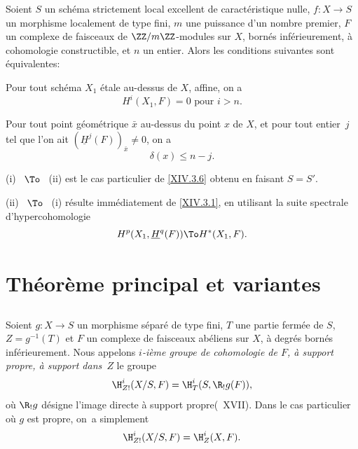 \begin{corollaire} \label{XIV.3.7}
Soient $S$ un sch\'ema strictement local excellent de caract\'eristique nulle, $f:X \to S$ un morphisme localement de type fini, $m$ une puissance d'un nombre premier, $F$ un complexe de faisceaux de $\ZZ/m\ZZ$-modules sur $X$, born\'es inf\'erieurement, \`a cohomologie constructible, et $n$ un entier. Alors les conditions suivantes sont \'equivalentes:
\begin{enumeratei}
\item
Pour tout sch\'ema $X_1$ \'etale au-dessus de $X$, affine, on a
$$
H^i(X_1, F)=0\text{ pour }i>n.
$$

\item
Pour tout point g\'eom\'etrique $\bar{x}$ au-dessus du point $x$ de $X$, et pour tout entier~$j$ tel que l'on ait $(\underline{H}^j(F))_{\bar{x}} \neq 0$, on a
$$
\delta(x) \leq n-j.
$$
\end{enumeratei}
\end{corollaire}

\textup{(i)} ~$\To$~ \textup{(ii)} est le cas particulier de \ref{XIV.3.6} obtenu en faisant $S=S'$.

\textup{(ii)} ~$\To$~ \textup{(i)} r\'esulte imm\'ediatement de \ref{XIV.3.1}, en utilisant la suite spectrale d'hypercohomologie
$$
H^p(X_1, \underline{H}^q(F)) \To H^*(X_1, F).
$$

\section{Th\'eor\`eme principal et variantes} \label{XIV.4}

\setcounter{subsection}{-1}

\subsection{} \label{XIV.4.0}
Soient $g\colon X\to S$ un morphisme s\'epar\'e de type fini, $T$ une partie ferm\'ee de $S$, \hbox{$Z=g^{-1}(T)$} et $F$ un complexe de faisceaux ab\'eliens sur $X$, \`a degr\'es born\'es inf\'erieurement. Nous appelons \emph{$i$-ième groupe de cohomologie de $F$, à support propre, à support dans~$Z$} le groupe
$$
\H_{Z!}^{i}(X/S, F)=\H_{T}^{i}(S, \R_{!}g(F)),
$$
o\`u $\R_{!}g$ d\'esigne \og l'image directe \`a support propre\fg (~XVII). Dans le cas particulier o\`u $g$ est propre, on~a simplement
$$
\H_{Z!}^{i}(X/S, F)=\H_{Z}^{i}(X, F).
$$

